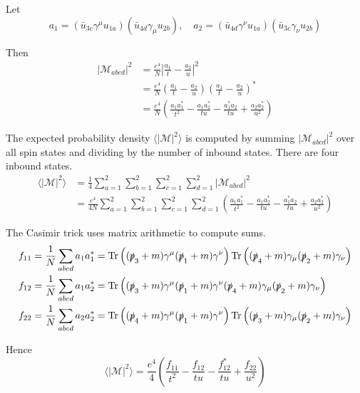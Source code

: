 \documentclass[12pt]{article}
\begin{document}
Let
\begin{equation*}
a_1=(\bar{u}_{3c}\gamma^\mu u_{1a})(\bar{u}_{4d}\gamma_\mu u_{2b}),
\quad
a_2=(\bar{u}_{4d}\gamma^\nu u_{1a})(\bar{u}_{3c}\gamma_\nu u_{2b})
\end{equation*}

Then
\begin{align*}
|\mathcal{M}_{abcd}|^2
&=
\frac{e^4}{N}
\left|\frac{a_1}{t} - \frac{a_2}{u}\right|^2\\
&=
\frac{e^4}{N}
\left(\frac{a_1}{t} - \frac{a_2}{u}\right)\left(\frac{a_1}{t} - \frac{a_2}{u}\right)^*\\
&=
\frac{e^4}{N}
\left(
\frac{a_1a_1^*}{t^2} - \frac{a_1a_2^*}{tu} -
\frac{a_1^*a_2}{tu} + \frac{a_2a_2^*}{u^2}
\right)
\end{align*}

The expected probability density $\langle|\mathcal{M}|^2\rangle$ is computed by
summing $|\mathcal{M}_{abcd}|^2$ over all spin states and dividing by the number
of inbound states.
There are four inbound states.
\begin{align*}
\langle|\mathcal{M}|^2\rangle
&=
\frac{1}{4}\sum_{a=1}^2\sum_{b=1}^2\sum_{c=1}^2\sum_{d=1}^2
|\mathcal{M}_{abcd}|^2\\
&=
\frac{e^4}{4N}\sum_{a=1}^2\sum_{b=1}^2\sum_{c=1}^2\sum_{d=1}^2
\left(
\frac{a_1a_1^*}{t^2}-\frac{a_1a_2^*}{tu}-\frac{a_1^*a_2}{tu}+\frac{a_2a_2^*}{u^2}
\right)
\end{align*}

The Casimir trick uses matrix arithmetic to compute sums.
\begin{align*}
f_{11}&=\frac{1}{N}\sum_{abcd}a_1a_1^*=
\mathop{\rm Tr}\left(
(\slashed{p}_3+m)\gamma^\mu(\slashed{p}_1+m)\gamma^\nu
\right)
\mathop{\rm Tr}\left(
(\slashed{p}_4+m)\gamma_\mu(\slashed{p}_2+m)\gamma_\nu
\right)
\\
f_{12}&=\frac{1}{N}\sum_{abcd}a_1a_2^*=
\mathop{\rm Tr}\left(
(\slashed{p}_3+m)\gamma^\mu(\slashed{p}_1+m)\gamma^\nu
(\slashed{p}_4+m)\gamma_\mu(\slashed{p}_2+m)\gamma_\nu
\right)
\\
f_{22}&=\frac{1}{N}\sum_{abcd}a_2a_2^*=
\mathop{\rm Tr}\left(
(\slashed{p}_4+m)\gamma^\mu(\slashed{p}_1+m)\gamma^\nu
\right)
\mathop{\rm Tr}\left(
(\slashed{p}_3+m)\gamma_\mu(\slashed{p}_2+m)\gamma_\nu
\right)
\end{align*}

Hence
\begin{equation*}
\langle|\mathcal{M}|^2\rangle
=\frac{e^4}{4}
\left(
\frac{f_{11}}{t^2}-\frac{f_{12}}{tu}-\frac{f_{12}^*}{tu}+\frac{f_{22}}{u^2}
\right)
\end{equation*}
\end{document}
